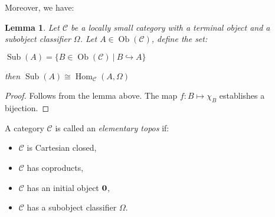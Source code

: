 \documentclass[a4paper]{article}
\theoremstyle{defin}
\theoremstyle{theorem}
\theoremstyle{claim}
\theoremstyle{prop}
\theoremstyle{lemma}
\newtheorem{lemma}{Lemma}
\theoremstyle{fact}
\theoremstyle{ex}
\theoremstyle{col}
\begin{document}
Moreover, we have:
\begin{lemma}
Let $\mathcal{C}$ be a locally small category with a terminal object and a subobject classifier $\Omega$. Let $A \in \operatorname{Ob}(\mathcal{C})$, define the set:

\begin{center}
$\operatorname{Sub}(A) = \{ B \in \operatorname{Ob}(\mathcal{C}) \: | \: B \hookrightarrow A \}$
\end{center}

then $\operatorname{Sub}(A) \cong \operatorname{Hom}_{\mathcal{C}}(A, \Omega)$
\end{lemma}

\begin{proof}
Follows from the lemma above. The map $f : B \mapsto \chi_B$ establishes a bijection.
\end{proof}

A category $\mathcal{C}$ is called an \emph{elementary topos} if:
\begin{itemize}
\item $\mathcal{C}$ is Cartesian closed,
\item $\mathcal{C}$ has coproducts,
\item $\mathcal{C}$ has an initial object ${\bf 0}$,
\item $\mathcal{C}$ has a subobject classifier $\Omega$.
\end{itemize}
\end{document}
